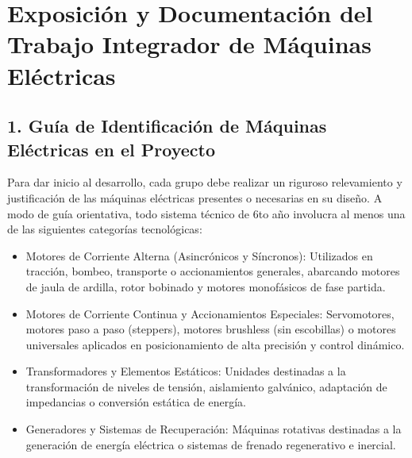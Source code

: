 \documentclass[../main]{subfiles}
\begin{document}
\section{Exposición y Documentación del Trabajo Integrador de
Máquinas Eléctricas}


\subsection{1. Guía de Identificación de Máquinas Eléctricas en el Proyecto}
Para dar inicio al desarrollo, cada grupo debe realizar un riguroso
relevamiento y justificación de las máquinas eléctricas presentes o
necesarias en su diseño. A modo de guía orientativa, todo sistema
técnico de 6to año involucra al menos una de las siguientes
categorías tecnológicas:
\begin{itemize}
  \item Motores de Corriente Alterna (Asincrónicos y Síncronos):
    Utilizados en tracción, bombeo, transporte o accionamientos
    generales, abarcando motores de jaula de ardilla, rotor bobinado
    y motores monofásicos de fase partida.
  \item Motores de Corriente Continua y Accionamientos Especiales:
    Servomotores, motores paso a paso (steppers), motores brushless
    (sin escobillas) o motores universales aplicados en
    posicionamiento de alta precisión y control dinámico.
  \item Transformadores y Elementos Estáticos: Unidades destinadas a
    la transformación de niveles de tensión, aislamiento galvánico,
    adaptación de impedancias o conversión estática de energía.
  \item Generadores y Sistemas de Recuperación: Máquinas rotativas
    destinadas a la generación de energía eléctrica o sistemas de
    frenado regenerativo e inercial.
\end{itemize}
\end{document}
